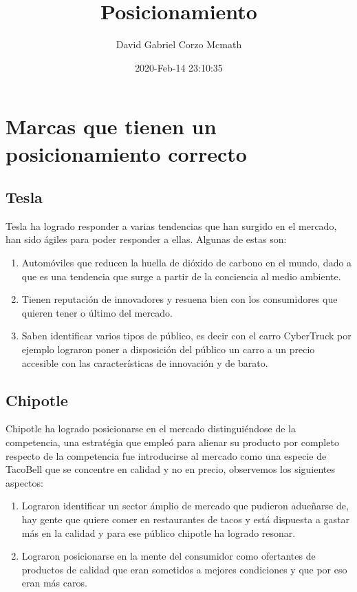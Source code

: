 \documentclass{article}
\title{Posicionamiento}
\author{David Gabriel Corzo Mcmath}
\date{2020-Feb-14 23:10:35}
\begin{document}
\maketitle


\section{Marcas que tienen un posicionamiento correcto}
\subsection{Tesla}
Tesla ha logrado responder a varias tendencias que han surgido en el mercado, han sido ágiles para poder responder a ellas. Algunas de estas son: 
\begin{enumerate}
    \item Automóviles que reducen la huella de dióxido de carbono en el mundo, dado a que es una tendencia que surge a partir de la conciencia al medio ambiente.
    \item Tienen reputación de innovadores y resuena bien con los consumidores que quieren tener o último del mercado.
    \item Saben identificar varios tipos de público, es decir con el carro CyberTruck por ejemplo lograron poner a disposición del público un carro a un precio accesible con las características de innovación y de barato.
\end{enumerate}

\subsection{Chipotle}
Chipotle ha logrado posicionarse en el mercado distinguiéndose de la competencia, una estratégia que empleó para alienar su producto por completo respecto de la competencia fue introducirse al mercado como una especie de TacoBell que se concentre en calidad y no en precio, observemos los siguientes aspectos:
\begin{enumerate}
    \item Lograron identificar un sector ámplio de mercado que pudieron adueñarse de, hay gente que quiere comer en restaurantes de tacos y está dispuesta a gastar más en la calidad y para ese público chipotle ha logrado resonar.
    \item Lograron posicionarse en la mente del consumidor como ofertantes de productos de calidad que eran sometidos a mejores condiciones y que por eso eran más caros.
\end{enumerate}
\end{document}
